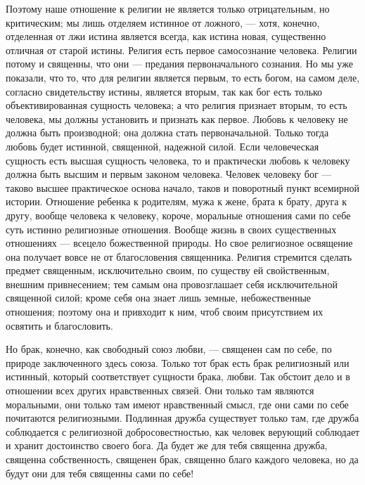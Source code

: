 \documentclass[12pt,oneside]{book}
\begin{document}
Поэтому наше отношение к религии не является только отрицательным, но критическим; мы лишь отделяем истинное от ложного, --- хотя, конечно, отделенная от лжи истина является всегда, как истина новая, существенно отличная от старой истины. Религия есть первое самосознание человека. Религии потому и священны, что они --- предания первоначального сознания. Но мы уже показали, что то, что для религии является первым, то есть богом, на самом деле, согласно свидетельству истины, является вторым, так как бог есть только объективированная сущность человека; а что религия признает вторым, то есть человека, мы должны установить и признать как первое. Любовь к человеку не должна быть производной; она должна стать первоначальной. Только тогда любовь будет истинной, священной, надежной силой. Если человеческая сущность есть высшая сущность человека, то и практически любовь к человеку должна быть высшим и первым законом человека. Человек человеку бог --- таково высшее практическое основа начало, таков и поворотный пункт всемирной истории. Отношение ребенка к родителям, мужа к жене, брата к брату, друга к другу, вообще человека к человеку, короче, моральные отношения сами по себе суть истинно религиозные отношения. Вообще жизнь в своих существенных отношениях --- всецело божественной природы. Но свое религиозное освящение она получает вовсе не от благословения священника. Религия стремится сделать предмет священным, исключительно своим, по существу ей свойственным, внешним привнесением; тем самым она провозглашает себя исключительной священной силой; кроме себя она знает лишь земные, небожественные отношения; поэтому она и привходит к ним, чтоб своим присутствием их освятить и благословить.

Но брак, конечно, как свободный союз любви\dag\let\svthefootnote\thefootnote\let\thefootnote\relax{}\let\thefootnote\svthefootnote, --- священен сам по себе, по природе заключенного здесь союза. Только тот брак есть брак религиозный или истинный, который соответствует сущности брака, любви. Так обстоит дело и в отношении всех других нравственных связей. Они только там являются моральными, они только там имеют нравственный смысл, где они сами по себе почитаются религиозными. Подлинная дружба существует только там, где дружба соблюдается с религиозной добросовестностью, как человек верующий соблюдает и хранит достоинство своего бога. Да будет же для тебя священна дружба, священна собственность, священен брак, священно благо каждого человека, но да будут они для тебя священны сами по себе!
\end{document}
